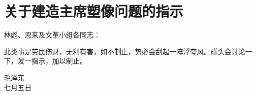 \section[关于建造主席塑像问题的指示（一九六七年七月五日）]{关于建造主席塑像问题的指示}


林彪、恩来及文革小组各同志：

此类事是劳民伤财，无利有害，如不制止，势必会刮起一阵浮夸风。碰头会讨论一下，发一指示，加以制止。
{\raggedleft 毛泽东\\七月五日\par}



